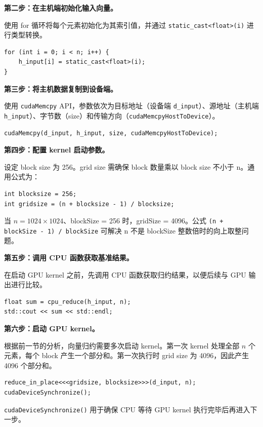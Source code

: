 \textbf{第二步：在主机端初始化输入向量。}

使用 for 循环将每个元素初始化为其索引值，并通过 \texttt{static\_cast<float>(i)} 进行类型转换。

\begin{lstlisting}
for (int i = 0; i < n; i++) {
    h_input[i] = static_cast<float>(i);
}
\end{lstlisting}

\textbf{第三步：将主机数据复制到设备端。}

使用 \texttt{cudaMemcpy} API，参数依次为目标地址（设备端 \texttt{d\_input}）、源地址（主机端 \texttt{h\_input}）、字节数（size）和传输方向（\texttt{cudaMemcpyHostToDevice}）。

\begin{lstlisting}
cudaMemcpy(d_input, h_input, size, cudaMemcpyHostToDevice);
\end{lstlisting}

\textbf{第四步：配置 kernel 启动参数。}

设定 block size 为 256。grid size 需确保 block 数量乘以 block size 不小于 n。通用公式为：

\begin{lstlisting}
int blocksize = 256;
int gridsize = (n + blocksize - 1) / blocksize;
\end{lstlisting}

当 $n = 1024 \times 1024$、blockSize = 256 时，gridSize = 4096。公式 \texttt{(n + blockSize - 1) / blockSize} 可解决 n 不是 blockSize 整数倍时的向上取整问题。

\textbf{第五步：调用 CPU 函数获取基准结果。}

在启动 GPU kernel 之前，先调用 CPU 函数获取归约结果，以便后续与 GPU 输出进行比较。

\begin{lstlisting}
float sum = cpu_reduce(h_input, n);
std::cout << sum << std::endl;
\end{lstlisting}

\textbf{第六步：启动 GPU kernel。}

根据前一节的分析，向量归约需要多次启动 kernel。第一次 kernel 处理全部 $n$ 个元素，每个 block 产生一个部分和。第一次执行时 grid size 为 4096，因此产生 4096 个部分和。

\begin{lstlisting}
reduce_in_place<<<gridsize, blocksize>>>(d_input, n);
cudaDeviceSynchronize();
\end{lstlisting}

\texttt{cudaDeviceSynchronize()} 用于确保 CPU 等待 GPU kernel 执行完毕后再进入下一步。

